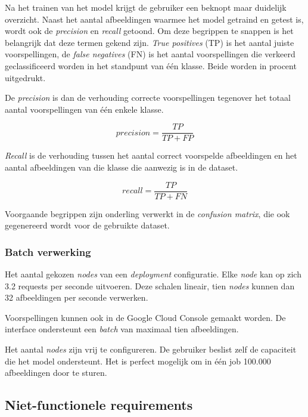 Na het trainen van het model krijgt de gebruiker een beknopt maar duidelijk overzicht. Naast het aantal afbeeldingen waarmee het model getraind en getest is, wordt ook de \textit{precision} en \textit{recall} getoond. Om deze begrippen te snappen is het belangrijk dat deze termen gekend zijn. \textit{True positives} (TP) is het aantal juiste voorspellingen, de \textit{false negatives} (FN) is het aantal voorspellingen die verkeerd geclassificeerd worden in het standpunt van één klasse. Beide worden in procent uitgedrukt.

De \textit{precision} is dan de verhouding correcte voorspellingen tegenover het totaal aantal voorspellingen van één enkele klasse.

\begin{equation}
    precision=\frac{TP}{TP+FP}
\end{equation}

\textit{Recall} is de verhouding tussen het aantal correct voorspelde afbeeldingen en het aantal afbeeldingen van die klasse die aanwezig is in de dataset.

\begin{equation}
    recall=\frac{TP}{TP+FN}
\end{equation}

Voorgaande begrippen zijn onderling verwerkt in de \textit{confusion matrix}, die ook gegenereerd wordt voor de gebruikte dataset.

\subsubsection{Batch verwerking}
\label{sucsubsec:google-fr-batch}

Het aantal gekozen \textit{nodes} van een \textit{deployment} configuratie. Elke \textit{node} kan op zich 3.2 requests per seconde uitvoeren. Deze schalen lineair, tien \textit{nodes} kunnen dan 32 afbeeldingen per seconde verwerken.

Voorspellingen kunnen ook in de Google Cloud Console gemaakt worden. De interface ondersteunt een \textit{batch} van maximaal tien afbeeldingen. 

Het aantal \textit{nodes} zijn vrij te configureren. De gebruiker beslist zelf de capaciteit die het model ondersteunt. Het is perfect mogelijk om in één job 100.000 afbeeldingen door te sturen.

\subsection{Niet-functionele requirements}
\label{subsec:googlautoml-nfr} 

